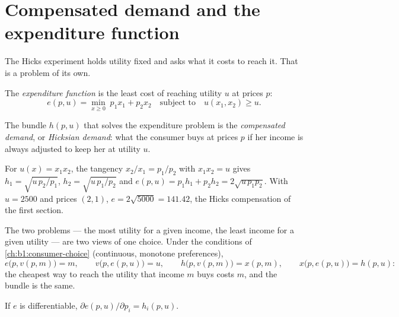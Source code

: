 \section{Compensated demand and the expenditure function}\label{sec:b1:income-and-substitution-effects:dual}

The Hicks experiment holds utility fixed and asks what it costs to reach
it. That is a problem of its own.

\begin{definition}\label{def:b1:income-and-substitution-effects:expenditure}
The \emph{expenditure function} is the least cost of reaching utility $u$ at
prices $p$:
\[
e(p, u) = \min_{x \ge 0}\; p_1x_1 + p_2x_2 \quad\text{subject to}\quad u(x_1, x_2) \ge u .
\]
\end{definition}

\begin{definition}\label{def:b1:income-and-substitution-effects:compensated}
The bundle $h(p, u)$ that solves the expenditure problem is the
\emph{compensated demand}, or \emph{Hicksian demand}: what the consumer buys
at prices $p$ if her income is always adjusted to keep her at utility $u$.
\end{definition}

For $u(x) = x_1x_2$, the tangency $x_2/x_1 = p_1/p_2$ with $x_1x_2 = u$ gives
$h_1 = \sqrt{u\,p_2/p_1}$, $h_2 = \sqrt{u\,p_1/p_2}$ and
$e(p, u) = p_1h_1 + p_2h_2 = 2\sqrt{u\,p_1p_2}$. With $u = 2500$ and prices
$(2, 1)$, $e = 2\sqrt{5000} = 141.42$, the Hicks compensation of the first
section.

The two problems --- the most utility for a given income, the least
income for a given utility --- are two views of one choice. Under the
conditions of \cref{ch:b1:consumer-choice} (continuous, monotone
preferences),
\begin{equation}\label{eq:b1:income-and-substitution-effects:duality}
e\bigl(p, v(p, m)\bigr) = m,\qquad v\bigl(p, e(p, u)\bigr) = u,\qquad
h\bigl(p, v(p, m)\bigr) = x(p, m),\qquad x\bigl(p, e(p, u)\bigr) = h(p, u):
\end{equation}
the cheapest way to reach the utility that income $m$ buys costs $m$, and
the bundle is the same.

\begin{proposition}\label{prop:b1:income-and-substitution-effects:shephard}
If $e$ is differentiable, $\partial e(p, u)/\partial p_i = h_i(p, u)$.
\end{proposition}

